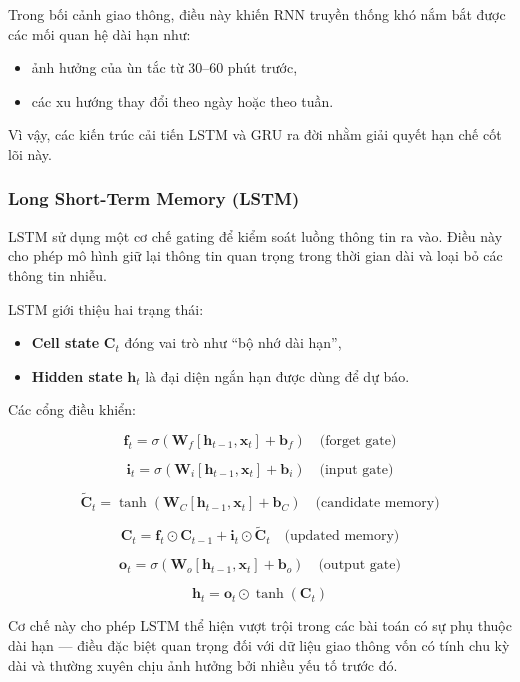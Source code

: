 Trong bối cảnh giao thông, điều này khiến RNN truyền thống khó nắm bắt được các mối quan hệ dài hạn như:
\begin{itemize}
    \item ảnh hưởng của ùn tắc từ 30–60 phút trước,
    \item các xu hướng thay đổi theo ngày hoặc theo tuần.
\end{itemize}

Vì vậy, các kiến trúc cải tiến LSTM và GRU ra đời nhằm giải quyết hạn chế cốt lõi này.

\subsubsection{Long Short-Term Memory (LSTM)}


LSTM sử dụng một cơ chế gating để kiểm soát luồng thông tin ra vào. Điều này cho phép mô hình giữ lại thông tin quan trọng trong thời gian dài và loại bỏ các thông tin nhiễu.

LSTM giới thiệu hai trạng thái:
\begin{itemize}
    \item \textbf{Cell state} $\mathbf{C}_t$ đóng vai trò như “bộ nhớ dài hạn”,
    \item \textbf{Hidden state} $\mathbf{h}_t$ là đại diện ngắn hạn được dùng để dự báo.
\end{itemize}

Các cổng điều khiển:

\[
\mathbf{f}_t = \sigma(\mathbf{W}_f[\mathbf{h}_{t-1}, \mathbf{x}_t] + \mathbf{b}_f) \quad \text{(forget gate)}
\]

\[
\mathbf{i}_t = \sigma(\mathbf{W}_i[\mathbf{h}_{t-1}, \mathbf{x}_t] + \mathbf{b}_i) \quad \text{(input gate)}
\]

\[
\tilde{\mathbf{C}}_t = \tanh(\mathbf{W}_C[\mathbf{h}_{t-1}, \mathbf{x}_t] + \mathbf{b}_C) \quad \text{(candidate memory)}
\]

\[
\mathbf{C}_t = \mathbf{f}_t \odot \mathbf{C}_{t-1} + \mathbf{i}_t \odot \tilde{\mathbf{C}}_t \quad \text{(updated memory)}
\]

\[
\mathbf{o}_t = \sigma(\mathbf{W}_o[\mathbf{h}_{t-1}, \mathbf{x}_t] + \mathbf{b}_o) \quad \text{(output gate)}
\]

\[
\mathbf{h}_t = \mathbf{o}_t \odot \tanh(\mathbf{C}_t)
\]

Cơ chế này cho phép LSTM thể hiện vượt trội trong các bài toán có sự phụ thuộc dài hạn — điều đặc biệt quan trọng đối với dữ liệu giao thông vốn có tính chu kỳ dài và thường xuyên chịu ảnh hưởng bởi nhiều yếu tố trước đó.


